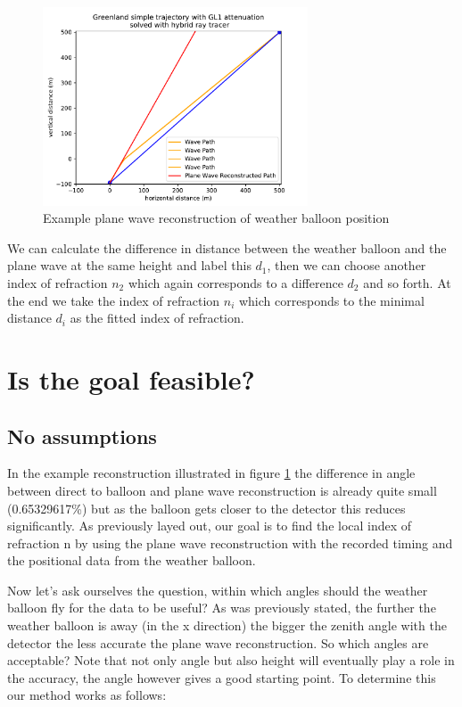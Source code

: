 \documentclass[11pt,a4paper,faculty=we,language=en,doctype=report]{cls/ugent-doc}
\begin{document}
\begin{figure}
	\centering
	\includegraphics[width=0.7\textwidth]{WeatherBalloonPositionReconstruction.pdf}
	\caption{Example plane wave reconstruction of weather balloon position}
	\label{fig:WeatherBalloonPositionReconstruction}
\end{figure}
We can calculate the difference in distance between the weather balloon and the plane wave at the same height
and label this $d_1$, then we can choose another index of refraction $n_2$ which again corresponds to a difference
$d_2$ and so forth. At the end we take the index of refraction $n_i$ which corresponds to the minimal distance $d_i$
as the fitted index of refraction.

\section{Is the goal feasible?}
\subsection{No assumptions}
In the example reconstruction illustrated in figure
\ref{fig:WeatherBalloonPositionReconstruction} the difference in angle between
direct to balloon and plane wave reconstruction is already quite small
(0.65329617\%) but as the balloon gets closer to the detector this reduces
significantly. As previously layed out, our goal is to find the local index of refraction n by using the
plane wave reconstruction with the recorded timing and the positional data from
the weather balloon.

Now let's ask ourselves the question, within which angles should the
weather balloon fly for the data to be useful?  As was previously stated, the
further the weather balloon is away (in the x direction) the bigger the zenith
angle with the detector the less accurate the plane wave reconstruction.  So
which angles are acceptable? Note that not only angle but also height will eventually
play a role in the accuracy, the angle however gives a good starting point.
To determine this our method works as follows: 
\end{document}
